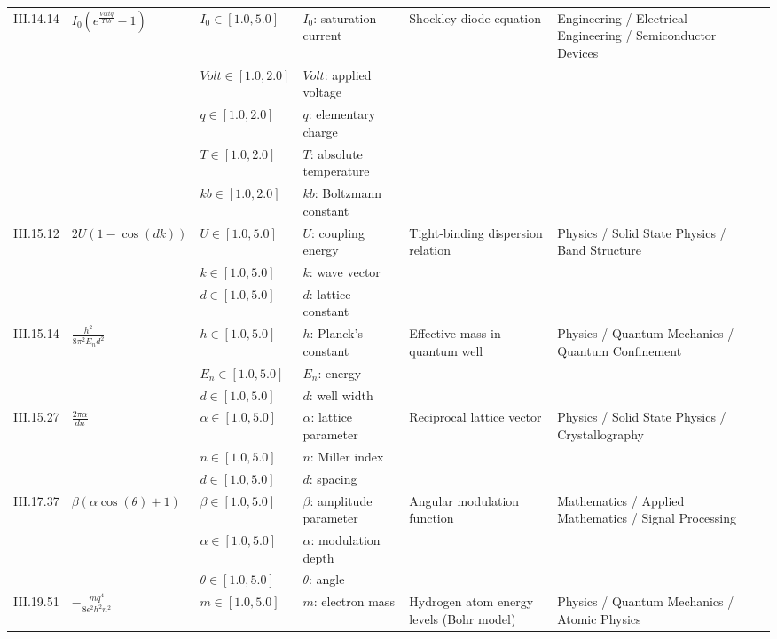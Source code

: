\begin{longtable}{llllp{4cm}p{4cm}p{4cm}}
\hline
III.14.14 & $I_{0} \left(e^{\frac{Volt q}{T kb}} - 1\right)$ & $\mathit{I_0} \in [1.0,5.0]$ & $I_0$: saturation current & Shockley diode equation & Engineering / Electrical Engineering / Semiconductor Devices & \\
 &  & $\mathit{Volt} \in [1.0,2.0]$ & $Volt$: applied voltage &  &  & \\
 &  & $\mathit{q} \in [1.0,2.0]$ & $q$: elementary charge &  &  & \\
 &  & $\mathit{T} \in [1.0,2.0]$ & $T$: absolute temperature &  &  & \\
 &  & $\mathit{kb} \in [1.0,2.0]$ & $kb$: Boltzmann constant &  &  & \\
\hline
III.15.12 & $2 U \left(1 - \cos{\left(d k \right)}\right)$ & $\mathit{U} \in [1.0,5.0]$ & $U$: coupling energy & Tight-binding dispersion relation & Physics / Solid State Physics / Band Structure & \\
 &  & $\mathit{k} \in [1.0,5.0]$ & $k$: wave vector &  &  & \\
 &  & $\mathit{d} \in [1.0,5.0]$ & $d$: lattice constant &  &  & \\
\hline
III.15.14 & $\frac{h^{2}}{8 \pi^{2} E_{n} d^{2}}$ & $\mathit{h} \in [1.0,5.0]$ & $h$: Planck's constant & Effective mass in quantum well & Physics / Quantum Mechanics / Quantum Confinement & \\
 &  & $\mathit{E_n} \in [1.0,5.0]$ & $E_n$: energy &  &  & \\
 &  & $\mathit{d} \in [1.0,5.0]$ & $d$: well width &  &  & \\
\hline
III.15.27 & $\frac{2 \pi \alpha}{d n}$ & $\alpha \in [1.0,5.0]$ & $\alpha$: lattice parameter & Reciprocal lattice vector & Physics / Solid State Physics / Crystallography & \\
 &  & $\mathit{n} \in [1.0,5.0]$ & $n$: Miller index &  &  & \\
 &  & $\mathit{d} \in [1.0,5.0]$ & $d$: spacing &  &  & \\
\hline
III.17.37 & $\beta \left(\alpha \cos{\left(\theta \right)} + 1\right)$ & $\beta \in [1.0,5.0]$ & $\beta$: amplitude parameter & Angular modulation function & Mathematics / Applied Mathematics / Signal Processing & \\
 &  & $\alpha \in [1.0,5.0]$ & $\alpha$: modulation depth &  &  & \\
 &  & $\theta \in [1.0,5.0]$ & $\theta$: angle &  &  & \\
\hline
III.19.51 & $- \frac{m q^{4}}{8 \epsilon^{2} h^{2} n^{2}}$ & $\mathit{m} \in [1.0,5.0]$ & $m$: electron mass & Hydrogen atom energy levels (Bohr model) & Physics / Quantum Mechanics / Atomic Physics & \\

\end{longtable}
